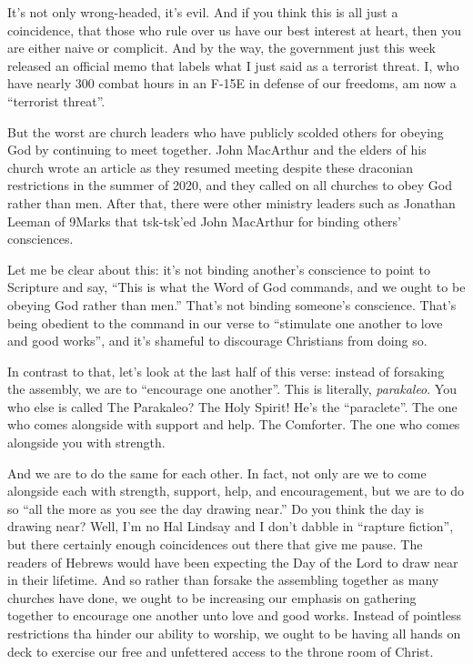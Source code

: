 \documentclass[letterpaper, 12pt]{article}
\begin{document}
    It's not only wrong-headed, it's evil. And if you think this is all
    just a coincidence, that those who rule over us have our best
    interest at heart, then you are either naive or complicit. And by
    the way, the government just this week released an official memo
    that labels what I just said as a terrorist threat. I, who have
    nearly 300 combat hours in an F-15E in defense of our freedoms, am
    now a ``terrorist threat''.

    But the worst are church leaders who have publicly scolded others
    for obeying God by continuing to meet together. John MacArthur and
    the elders of his church wrote an article as they resumed meeting
    despite these draconian restrictions in the summer of 2020, and they
    called on all churches to obey God rather than men. After that,
    there were other ministry leaders such as Jonathan Leeman of 9Marks
    that tsk-tsk'ed John MacArthur for binding others' consciences. 

    Let me be clear about this: it's not binding another's conscience to
    point to Scripture and say, ``This is what the Word of God commands,
    and we ought to be obeying God rather than men.'' That's not binding
    someone's conscience. That's being obedient to the command in our
    verse to ``stimulate one another to love and good works'', and it's
    shameful to discourage Christians from doing so.

    In contrast to that, let's look at the last half of this verse:
    instead of forsaking the assembly, we are to ``encourage one
    another''. This is literally, \emph{parakaleo}. You who else is
    called The Parakaleo? The Holy Spirit! He's the ``paraclete''. The
    one who comes alongside with support and help. The Comforter. The
    one who comes alongside you with strength.

    And we are to do the same for each other. In fact, not only are we
    to come alongside each with strength, support, help, and
    encouragement, but we are to do so ``all the more as you see the day
    drawing near.'' Do you think the day is drawing near? Well, I'm no
    Hal Lindsay and I don't dabble in ``rapture fiction'', but there
    certainly enough coincidences out there that give me pause. The
    readers of Hebrews would have been expecting the Day of the Lord to
    draw near in their lifetime. And so rather than forsake the
    assembling together as many churches have done, we ought to be
    increasing our emphasis on gathering together to encourage one
    another unto love and good works. Instead of pointless restrictions
    tha hinder our ability to worship, we ought to be having all hands
    on deck to exercise our free and unfettered access to the throne
    room of Christ.
\end{document}
